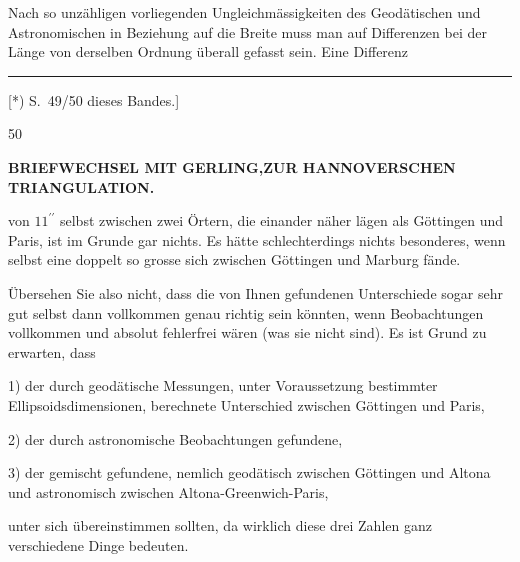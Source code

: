 \par\noindent\hspace*{\parindent}Nach so unzähligen vorliegenden Ungleichmässigkeiten des Geodätischen und Astronomischen in Beziehung auf die Breite muss man auf Differenzen bei der Länge von derselben Ordnung überall gefasst sein. Eine Differenz
\par\vfill
\noindent\rule{.22\linewidth}{.4pt}\par\smallskip
{\footnotesize\noindent\hspace*{\parindent}[*) S.~49/50 dieses Bandes.]\par}
\medskip{}\hfill 50\hspace*{1.5em}\par

\clearpage
\noindent{}\hfill{\footnotesize\textbf{BRIEFWECHSEL MIT GERLING,\quad ZUR HANNOVERSCHEN TRIANGULATION.}}\hfill\null\par\medskip
\noindent von \(11^{\prime\prime}\) selbst zwischen zwei Örtern, die einander  näher lägen als Göttingen und Paris, ist im Grunde gar nichts. Es hätte schlechterdings nichts besonderes, wenn selbst eine doppelt so grosse sich zwischen Göttingen und Marburg fände.
\par\noindent\hspace*{\parindent}Übersehen Sie also nicht, dass die von Ihnen gefundenen Unterschiede sogar sehr gut selbst dann vollkommen genau richtig sein könnten, wenn  Beobachtungen vollkommen und absolut fehlerfrei wären (was sie nicht sind). Es ist  Grund zu erwarten, dass
\par\noindent\hspace*{\parindent}1) der durch geodätische Messungen, unter Voraussetzung bestimmter Ellipsoidsdimensionen, berechnete Unterschied zwischen Göttingen und Paris,
\par\noindent\hspace*{\parindent}2) der durch astronomische Beobachtungen gefundene,
\par\noindent\hspace*{\parindent}3) der gemischt gefundene, nemlich geodätisch zwischen Göttingen und Altona und astronomisch zwischen Altona-Greenwich-Paris,
\par\noindent unter sich übereinstimmen sollten, da wirklich diese drei Zahlen ganz verschiedene Dinge bedeuten.
